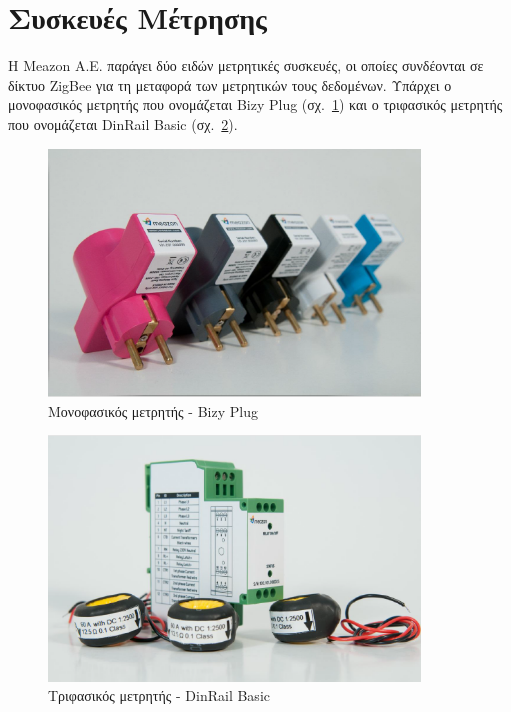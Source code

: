 \documentclass[12pt, a4paper, oneside]{report}
\begin{document}
\section{Συσκευές Μέτρησης}

H Meazon Α.Ε. παράγει δύο ειδών μετρητικές συσκευές, οι οποίες συνδέονται σε δίκτυο ZigBee για τη μεταφορά των μετρητικών τους δεδομένων. Υπάρχει ο μονοφασικός μετρητής που ονομάζεται Bizy Plug (σχ.~\ref{eik11}) και ο τριφασικός μετρητής που ονομάζεται DinRail Basic (σχ.~\ref{eik12}). 
\begin{figure}[!ht]
\centering
\includegraphics[width=0.88\textwidth]{eikona_11}
\caption[Μονοφασικός μετρητής - Bizy Plug]{Μονοφασικός μετρητής - Bizy Plug\cite{biz}}\label{eik11}
\end{figure}

\begin{figure}[!tb]
\centering
\includegraphics[width=0.88\textwidth]{eikona_12}
\caption[Τριφασικός μετρητής - DinRail Basic]{Τριφασικός μετρητής - DinRail Basic\cite{din}}\label{eik12}
\end{figure}
\end{document}
